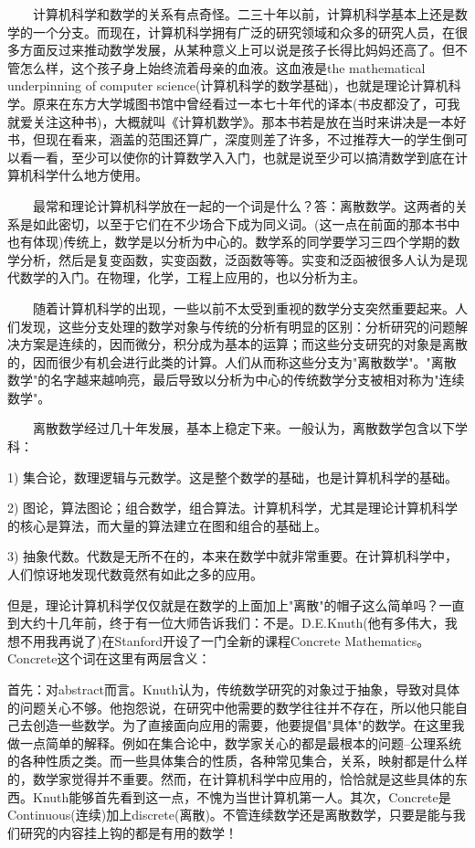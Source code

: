 　　计算机科学和数学的关系有点奇怪。二三十年以前，计算机科学基本上还是数学的一个分支。而现在，计算机科学拥有广泛的研究领域和众多的研究人员，在很多方面反过来推动数学发展，从某种意义上可以说是孩子长得比妈妈还高了。但不管怎么样，这个孩子身上始终流着母亲的血液。这血液是the mathematical underpinning of computer science(计算机科学的数学基础)，也就是理论计算机科学。原来在东方大学城图书馆中曾经看过一本七十年代的译本(书皮都没了，可我就爱关注这种书)，大概就叫《计算机数学》。那本书若是放在当时来讲决是一本好书，但现在看来，涵盖的范围还算广，深度则差了许多，不过推荐大一的学生倒可以看一看，至少可以使你的计算数学入入门，也就是说至少可以搞清数学到底在计算机科学什么地方使用。 

　　最常和理论计算机科学放在一起的一个词是什么？答：离散数学。这两者的关系是如此密切，以至于它们在不少场合下成为同义词。(这一点在前面的那本书中也有体现)传统上，数学是以分析为中心的。数学系的同学要学习三四个学期的数学分析，然后是复变函数，实变函数，泛函数等等。实变和泛函被很多人认为是现代数学的入门。在物理，化学，工程上应用的，也以分析为主。 

　　随着计算机科学的出现，一些以前不太受到重视的数学分支突然重要起来。人们发现，这些分支处理的数学对象与传统的分析有明显的区别：分析研究的问题解决方案是连续的，因而微分，积分成为基本的运算；而这些分支研究的对象是离散的，因而很少有机会进行此类的计算。人们从而称这些分支为"离散数学"。"离散数学"的名字越来越响亮，最后导致以分析为中心的传统数学分支被相对称为"连续数学"。 

　　离散数学经过几十年发展，基本上稳定下来。一般认为，离散数学包含以下学科： 

1) 集合论，数理逻辑与元数学。这是整个数学的基础，也是计算机科学的基础。 

2) 图论，算法图论；组合数学，组合算法。计算机科学，尤其是理论计算机科学的核心是算法，而大量的算法建立在图和组合的基础上。 

3) 抽象代数。代数是无所不在的，本来在数学中就非常重要。在计算机科学中，人们惊讶地发现代数竟然有如此之多的应用。 

但是，理论计算机科学仅仅就是在数学的上面加上"离散"的帽子这么简单吗？一直到大约十几年前，终于有一位大师告诉我们：不是。D.E.Knuth(他有多伟大，我想不用我再说了)在Stanford开设了一门全新的课程Concrete Mathematics。 Concrete这个词在这里有两层含义： 

首先：对abstract而言。Knuth认为，传统数学研究的对象过于抽象，导致对具体的问题关心不够。他抱怨说，在研究中他需要的数学往往并不存在，所以他只能自己去创造一些数学。为了直接面向应用的需要，他要提倡"具体"的数学。在这里我做一点简单的解释。例如在集合论中，数学家关心的都是最根本的问题--公理系统的各种性质之类。而一些具体集合的性质，各种常见集合，关系，映射都是什么样的，数学家觉得并不重要。然而，在计算机科学中应用的，恰恰就是这些具体的东西。Knuth能够首先看到这一点，不愧为当世计算机第一人。其次，Concrete是Continuous(连续)加上discrete(离散)。不管连续数学还是离散数学，只要是能与我们研究的内容挂上钩的都是有用的数学！ 

